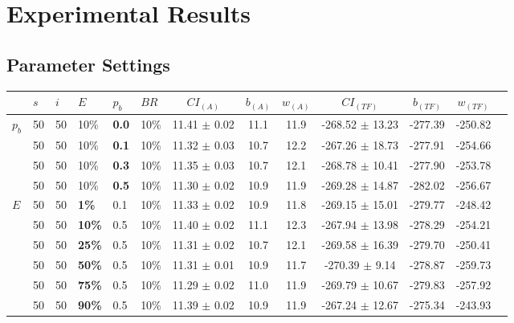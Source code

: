 \chapter{Experimental Results}
\label{appendixC}

\section{Parameter Settings}

\begin{sidewaystable}
    \begin{tabular}{|l|l|l|l|l|l||c|c|c|c|c|c|c|}
    \hline
    ~ & $s$ & $i$ & $E$ & $p_{b}$ & $BR$ & $CI_{(A)}$ & $b_{(A)}$ & $w_{(A)}$ & $CI_{(TF)}$ & $b_{(TF)}$ & $w_{(TF)}$\\
    \hline
    $p_{b}$ & 50 & 50 & 10\% & \textbf{0.0} & 10\% & 11.41 $\pm$ 0.02 & 11.1 & 11.9 & -268.52 $\pm$ 13.23 & -277.39 & -250.82 \\
    ~ & 50 & 50 & 10\% & \textbf{0.1} & 10\% & 11.32 $\pm$ 0.03 & 10.7 & 12.2 & -267.26 $\pm$ 18.73 & -277.91 & -254.66 \\
    ~ & 50 & 50 & 10\% & \textbf{0.3} & 10\% & 11.35 $\pm$ 0.03 & 10.7 & 12.1 & -268.78 $\pm$ 10.41 & -277.90 & -253.78 \\
    ~ & 50 & 50 & 10\% & \textbf{0.5} & 10\% & 11.30 $\pm$ 0.02 & 10.9 & 11.9 & -269.28 $\pm$ 14.87 & -282.02 & -256.67\\
    \hline
    \hline
    $E$ & 50 & 50 & \textbf{1\%} & 0.1 & 10\% & 11.33 $\pm$ 0.02 & 10.9 & 11.8 & -269.15 $\pm$ 15.01 & -279.77 & -248.42 \\
    ~ & 50 & 50 & \textbf{10\%} & 0.5 & 10\% & 11.40 $\pm$ 0.02  & 11.1& 12.3 & -267.94 $\pm$ 13.98 & -278.29 & -254.21 \\
    ~ & 50 & 50 & \textbf{25\%} & 0.5 & 10\% &  11.31 $\pm$ 0.02 & 10.7 & 12.1 & -269.58 $\pm$ 16.39 & -279.70 & -250.41 \\
    ~ & 50 & 50 & \textbf{50\%} & 0.5 & 10\% & 11.31 $\pm$ 0.01 & 10.9 & 11.7 & -270.39 $\pm$ 9.14  & -278.87 & -259.73 \\
    ~ & 50 & 50 & \textbf{75\%} & 0.5 & 10\% & 11.29 $\pm$ 0.02 & 11.0 & 11.9 & -269.79 $\pm$ 10.67 & -279.83 & -257.92 \\
    ~ & 50 & 50 & \textbf{90\%} & 0.5 & 10\% & 11.39 $\pm$ 0.02 & 10.9 & 11.9 & -267.24 $\pm$ 12.67 & -275.34 & -243.93 \\

\end{tabular}
\end{sidewaystable}
